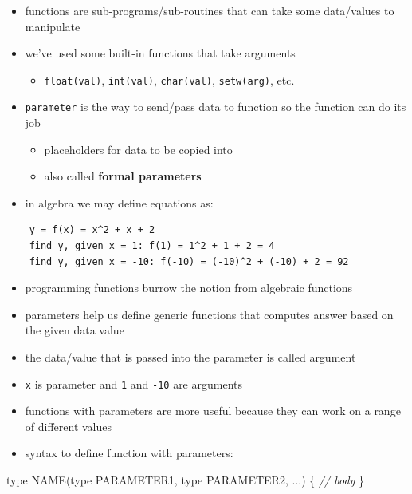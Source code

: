 \documentclass[11pt]{article}
\providecommand{\tightlist}{%
      \setlength{\itemsep}{0pt}\setlength{\parskip}{0pt}}
\newenvironment{Shaded}{}{}
\newcommand{\CommentTok}[1]{\textcolor[rgb]{0.38,0.63,0.69}{\textit{{#1}}}}
\newcommand{\NormalTok}[1]{{#1}}
\newcommand{\OperatorTok}[1]{\textcolor[rgb]{0.40,0.40,0.40}{{#1}}}
\begin{document}
\begin{itemize}
\tightlist
\item
  functions are sub-programs/sub-routines that can take some data/values
  to manipulate
\item
  we've used some built-in functions that take arguments

  \begin{itemize}
  \tightlist
  \item
    \texttt{float(val)}, \texttt{int(val)}, \texttt{char(val)},
    \texttt{setw(arg)}, etc.
  \end{itemize}
\item
  \texttt{parameter} is the way to send/pass data to function so the
  function can do its job

  \begin{itemize}
  \tightlist
  \item
    placeholders for data to be copied into
  \item
    also called \textbf{formal parameters}
  \end{itemize}
\item
  in algebra we may define equations as:
\end{itemize}

\begin{verbatim}
    y = f(x) = x^2 + x + 2
    find y, given x = 1: f(1) = 1^2 + 1 + 2 = 4
    find y, given x = -10: f(-10) = (-10)^2 + (-10) + 2 = 92
\end{verbatim}

\begin{itemize}
\tightlist
\item
  programming functions burrow the notion from algebraic functions
\item
  parameters help us define generic functions that computes answer based
  on the given data value
\item
  the data/value that is passed into the parameter is called argument
\item
  \texttt{x} is parameter and \texttt{1} and \texttt{-10} are arguments
\item
  functions with parameters are more useful because they can work on a
  range of different values
\item
  syntax to define function with parameters:
\end{itemize}

\begin{Shaded}
\begin{Highlighting}[]
\NormalTok{    type NAME}\OperatorTok{(}\NormalTok{type PARAMETER1}\OperatorTok{,}\NormalTok{ type PARAMETER2}\OperatorTok{,} \OperatorTok{...)} \OperatorTok{\{}
        \CommentTok{// body}
    \OperatorTok{\}}
\end{Highlighting}
\end{Shaded}
\end{document}

